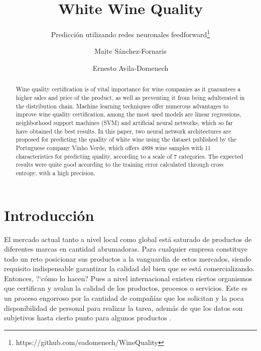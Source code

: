 \documentclass[runningheads]{llncs}
\begin{document}
%
\title{White Wine Quality}
\subtitle{Predicci{\'o}n utilizando redes neuronales feedforward\footnote{https://github.com/eadomenech/WineQuality }}
%
%
\author{Maite S{\'a}nchez-Fornaris \and
Ernesto Avila-Domenech}
%
%
%
\maketitle              %
%
\begin{abstract}
Wine quality certification is of vital importance for wine companies as it guarantees a higher sales and price of the product, as well as preventing it from being adulterated in the distribution chain. Machine learning techniques offer numerous advantages to improve wine quality certification, among the most used models are linear regressions, neighborhood support machines (SVM) and artificial neural networks, which so far have obtained the best results. In this paper, two neural network architectures are proposed for predicting the quality of white wine using the dataset published by the Portuguese company Vinho Verde, which offers 4898 wine samples with 11 characteristics for predicting quality, according to a scale of 7 categories. The expected results were quite good according to the training error calculated through cross entropy, with a high precision.

\end{abstract}
%
%
%
\section{Introducci{\'o}n}
El mercado actual tanto a nivel local como global est{\'a} saturado de productos de diferentes marcas en cantidad abrumadoras. Para cualquier empresa constituye todo un reto posicionar sus productos a la vanguardia de estos mercados, siendo requisito indispensable garantizar la calidad del bien que se est{\'a} comercializando. Entonces, ?`c{\'o}mo lo hacen? Pues a nivel internacional existen ciertos organismos que certifican y avalan la calidad de los productos, procesos o servicios. Este es un proceso engorroso por la cantidad de compa\~{n}{\'i}as que los solicitan y la poca disponibilidad de personal para realizar la tarea, adem{\'a}s de que los datos son subjetivos hasta cierto punto para algunos productos \cite{ye2020new}.
\end{document}
